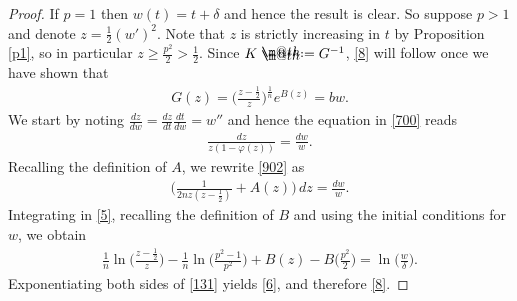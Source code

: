 \documentclass[12pt]{article}
\makeatletter
\numberwithin{equation}{section}
\theoremstyle{plain}
\theoremstyle{definition}
\renewcommand{\phi}{\varphi}
\newcommand*{\defeq}{\mathrel{\rlap{%
			\raisebox{0.3ex}{$\m@th\cdot$}}%
		\raisebox{-0.3ex}{$\m@th\cdot$}}%
	=}
\makeatother
\begin{document}
	
	\begin{proof}
	If $p=1$ then $w(t) = t+\delta$ and hence the result is clear. So suppose $p>1$ and denote $z = \frac{1}{2}(w')^2$. Note that $z$ is strictly increasing in $t$ by Proposition \ref{p1}, so in particular $z \geq \frac{p^2}{2}>\frac{1}{2}$. Since $K\defeq G^{-1}$, \eqref{8} will follow once we have shown that
	\begin{align}\label{6}
	G(z) = \bigg(\frac{z-\frac{1}{2}}{z}\bigg)^{\frac{1}{n}} e^{B(z)} = bw.
	\end{align}
	We start by noting $\frac{dz}{dw} = \frac{dz}{dt}\frac{dt}{dw} = w''$ and hence the equation in \eqref{700} reads
	\begin{align}\label{902}
	\frac{dz}{z(1-\phi(z))} = \frac{dw}{w}.
	\end{align}
	Recalling the definition of $A$, we rewrite \eqref{902} as
	\begin{align}\label{5}
	\bigg(\frac{1}{2nz(z-\frac{1}{2})} + A(z)\bigg)\,dz = \frac{dw}{w}.
	\end{align}
	Integrating in \eqref{5}, recalling the definition of $B$ and using the initial conditions for $w$, we obtain
	\begin{align}\label{131}
	\frac{1}{n}\ln\bigg(\frac{z-\frac{1}{2}}{z}\bigg) - \frac{1}{n} \ln\bigg(\frac{p^2-1}{p^2}\bigg) + B(z) - B\bigg(\frac{p^2}{2}\bigg) = \ln\bigg(\frac{w}{\delta}\bigg).
	\end{align}
	Exponentiating both sides of \eqref{131} yields \eqref{6}, and therefore \eqref{8}.\end{proof}
\end{document}

